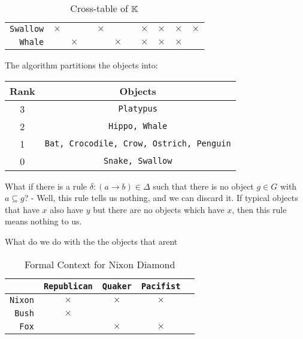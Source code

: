 \begin{small}
\begin{table}[h]
\begin{tabular}{r|c c c c c c c c c c }
            \texttt{Swallow}   & $\times$        &                   &                    & $\times$          &                    &                        & $\times$             & $\times$            & $\times$             & $\times$        \\
            \texttt{Whale}     &                 & $\times$          &                    &                   & $\times$           &                        & $\times$             & $\times$            & $\times$             &                 \\
        \end{tabular}
        \caption{Cross-table of $\mathbb{K}$}
        \label{tab:formal-context}
    \end{table}
\end{small}

The algorithm partitions the objects into:

\begin{table}[h]
    \centering
    \begin{tabular}{|c|c|}
        \hline
        \textbf{Rank} & \textbf{Objects}                                \\
        \hline
        3             & \texttt{Platypus}                               \\
        \hline
        2             & \texttt{Hippo, Whale}                           \\
        \hline
        1             & \texttt{Bat, Crocodile, Crow, Ostrich, Penguin} \\
        \hline
        0             & \texttt{Snake, Swallow}                         \\
        \hline
    \end{tabular}
\end{table}



What if there is a rule $\delta: (a \rightarrow b) \in \Delta$ such that there is no object $g \in G$ with $a \subseteq g$? - Well, this rule tells us nothing, and we can discard it. If typical objects that have $x$ also have $y$ but there are no objects which have $x$, then this rule means nothing to us.

What do we do with the the objects that arent

\begin{table}
    \centering
    \begin{tabular}{r|cccc}
                       & \texttt{Republican} & \texttt{Quaker} & \texttt{Pacifist} \\
        \hline
        \texttt{Nixon} & $\times$            & $\times$        & $\times$          \\
        \texttt{Bush}  & $\times$            &                 &                   \\
        \texttt{Fox}   &                     & $\times$        & $\times$          \\
    \end{tabular}
    \caption{Formal Context for Nixon Diamond}
    \label{tab:nixon-diamond}
\end{table}

